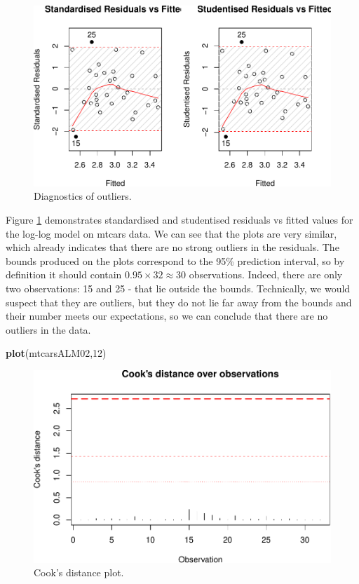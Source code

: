 \documentclass[
]{book}
\newenvironment{Shaded}{\begin{snugshade}}{\end{snugshade}}
\newcommand{\DecValTok}[1]{\textcolor[rgb]{0.00,0.00,0.81}{#1}}
\newcommand{\KeywordTok}[1]{\textcolor[rgb]{0.13,0.29,0.53}{\textbf{#1}}}
\newcommand{\NormalTok}[1]{#1}
\theoremstyle{definition}
\theoremstyle{definition}
\theoremstyle{definition}
\theoremstyle{definition}
\theoremstyle{remark}
\begin{document}
\begin{figure}
\centering
\includegraphics{Svetunkov---Statistics-for-Business-Analytics_files/figure-latex/diagnostics05-1.pdf}
\caption{\label{fig:diagnostics05}Diagnostics of outliers.}
\end{figure}

Figure \ref{fig:diagnostics05} demonstrates standardised and studentised residuals vs fitted values for the log-log model on mtcars data. We can see that the plots are very similar, which already indicates that there are no strong outliers in the residuals. The bounds produced on the plots correspond to the 95\% prediction interval, so by definition it should contain \(0.95\times 32 \approx 30\) observations. Indeed, there are only two observations: 15 and 25 - that lie outside the bounds. Technically, we would suspect that they are outliers, but they do not lie far away from the bounds and their number meets our expectations, so we can conclude that there are no outliers in the data.

\begin{Shaded}
\begin{Highlighting}[]
\KeywordTok{plot}\NormalTok{(mtcarsALM02,}\DecValTok{12}\NormalTok{)}
\end{Highlighting}
\end{Shaded}

\begin{figure}
\centering
\includegraphics{Svetunkov---Statistics-for-Business-Analytics_files/figure-latex/diagnostics06-1.pdf}
\caption{\label{fig:diagnostics06}Cook's distance plot.}
\end{figure}
\end{document}
